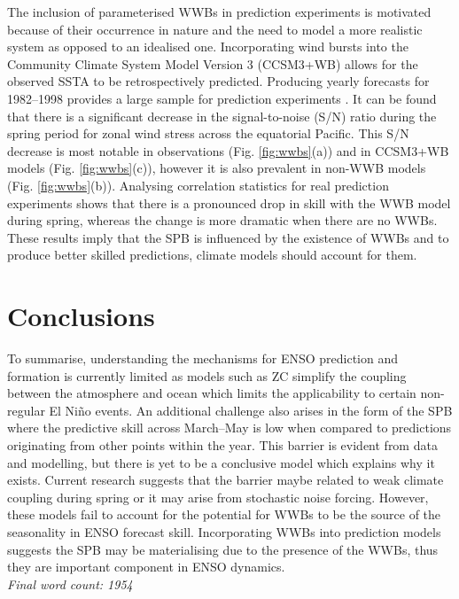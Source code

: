 \documentclass[12pt, onecolumn]{revtex4}    %
\begin{document}
The inclusion of parameterised WWBs in prediction experiments is motivated because of their occurrence in nature and the need to model a more realistic system as opposed to an idealised one. Incorporating wind bursts into the Community Climate System Model Version 3 \citep{collins2006community} (CCSM3+WB) allows for the observed SSTA to be retrospectively predicted. Producing yearly forecasts for 1982--1998 provides a large sample for prediction experiments \citep{lopez2014wwbs}. It can be found that there is a significant decrease in the signal-to-noise (S/N) ratio during the spring period for zonal wind stress across the equatorial Pacific. This S/N decrease is most notable in observations (Fig. \ref{fig:wwbs}(a)) and in CCSM3+WB models (Fig. \ref{fig:wwbs}(c)), however it is also prevalent in non-WWB models (Fig. \ref{fig:wwbs}(b)). Analysing correlation statistics for real prediction experiments shows that there is a pronounced drop in skill with the WWB model during spring, whereas the change is more dramatic when there are no WWBs. These results imply that the SPB is influenced by the existence of WWBs and to produce better skilled predictions, climate models should account for them.

\section{Conclusions}

To summarise, understanding the mechanisms for ENSO prediction and formation is currently limited as models such as ZC simplify the coupling between the atmosphere and ocean which limits the applicability to certain non-regular El Ni\~{n}o events. An additional challenge also arises in the form of the SPB where the predictive skill across March--May is low when compared to predictions originating from other points within the year. This barrier is evident from data and modelling, but there is yet to be a conclusive model which explains why it exists. Current research suggests that the barrier maybe related to weak climate coupling during spring or it may arise from stochastic noise forcing. However, these models fail to account for the potential for WWBs to be the source of the seasonality in ENSO forecast skill. Incorporating WWBs into prediction models suggests the SPB may be materialising due to the presence of the WWBs, thus they are important component in ENSO dynamics. \\

\textit{Final word count: 1954}


\clearpage



\end{document}
